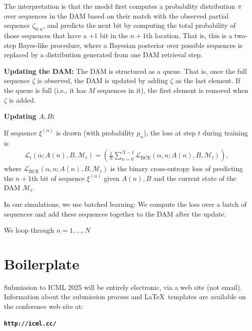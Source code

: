 \documentclass{article}
\theoremstyle{plain}
\theoremstyle{definition}
\theoremstyle{remark}
\begin{document}
The interpretation is that the model first computes a probability distribution $\pi$ over sequences in the DAM based on their match with the observed partial sequence $\zeta_{0:n}$, and predicts the next bit by computing the total probability of those sequences that have a $+1$ bit in the $n+1$th location. That is, this is a two-step Bayes-like procedure, where a Bayesian posterior over possible sequences is replaced by a distribution generated from one DAM retrieval step. 

\textbf{Updating the DAM:} The DAM is structured as a queue. That is, once the full sequence $\zeta$ is observed, the DAM is updated by adding $\zeta$ as the last element. If the queue is full (i.e., it has $M$ sequences in it), the first element is removed when $\zeta$ is added. 

\clearpage

\textbf{Updating $A,B$:} 


If sequence $\xi^{(\alpha)}$ is drawn (with probability $p_{\alpha}$), the loss at step $t$ during training is
\begin{align}
\mathcal{L}_t(\alpha; A(n), B, \mathcal{M}_t) = \left( \frac{1}{N} \sum_{n=0}^{N-1} \mathcal {L}_{\text{BCE}}( {\alpha,n} ; A(n), B, \mathcal{M}_t)\right),
\end{align} where $\mathcal {L}_{\text{BCE}}(\alpha, n; A(n), B, \mathcal{M}_t)$ is the binary cross-entropy loss of predicting the $n+1$th bit of sequence $\xi^{(\alpha)}$ given $A(n), B$ and the current state of the DAM $\mathcal{M}_t$. 


In our simulations, we use batched learning: We compute the loss over a batch of sequences and add these sequences together to the DAM after the update. 

We loop through $n=1,\ldots,N$

\section{Boilerplate}
Submission to ICML 2025 will be entirely electronic, via a web site
(not email). Information about the submission process and \LaTeX\ templates
are available on the conference web site at:
\begin{center}
\textbf{\texttt{http://icml.cc/}}
\end{center}
\end{document}
